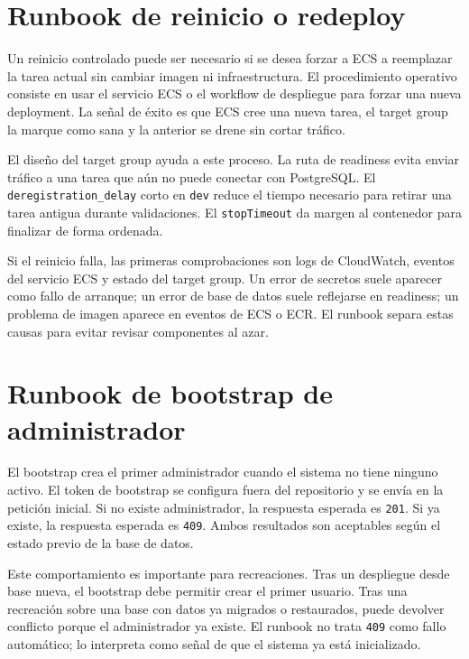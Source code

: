 \section{Runbook de reinicio o redeploy}
\label{sec:runbook-redeploy}

Un reinicio controlado puede ser necesario si se desea forzar a ECS a reemplazar la tarea actual sin cambiar imagen ni infraestructura. El procedimiento operativo consiste en usar el servicio ECS o el workflow de despliegue para forzar una nueva deployment. La señal de éxito es que ECS cree una nueva tarea, el target group la marque como sana y la anterior se drene sin cortar tráfico.

El diseño del target group ayuda a este proceso. La ruta de readiness evita enviar tráfico a una tarea que aún no puede conectar con PostgreSQL. El \texttt{deregistration\_delay} corto en \texttt{dev} reduce el tiempo necesario para retirar una tarea antigua durante validaciones. El \texttt{stopTimeout} da margen al contenedor para finalizar de forma ordenada.

Si el reinicio falla, las primeras comprobaciones son logs de CloudWatch, eventos del servicio ECS y estado del target group. Un error de secretos suele aparecer como fallo de arranque; un error de base de datos suele reflejarse en readiness; un problema de imagen aparece en eventos de ECS o ECR. El runbook separa estas causas para evitar revisar componentes al azar.

\section{Runbook de bootstrap de administrador}
\label{sec:runbook-bootstrap}

El bootstrap crea el primer administrador cuando el sistema no tiene ninguno activo. El token de bootstrap se configura fuera del repositorio y se envía en la petición inicial. Si no existe administrador, la respuesta esperada es \texttt{201}. Si ya existe, la respuesta esperada es \texttt{409}. Ambos resultados son aceptables según el estado previo de la base de datos.

Este comportamiento es importante para recreaciones. Tras un despliegue desde base nueva, el bootstrap debe permitir crear el primer usuario. Tras una recreación sobre una base con datos ya migrados o restaurados, puede devolver conflicto porque el administrador ya existe. El runbook no trata \texttt{409} como fallo automático; lo interpreta como señal de que el sistema ya está inicializado.

